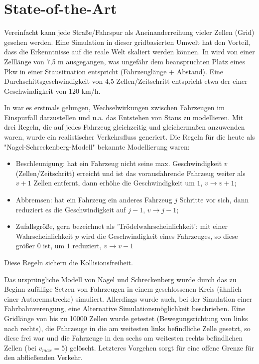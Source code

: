 \section{State-of-the-Art}
\label{sec:sota}

Vereinfacht kann jede Straße/Fahrspur als Aneinanderreihung vieler Zellen (Grid) gesehen werden. Eine Simulation in dieser gridbasierten Umwelt hat den Vorteil, dass die Erkenntnisse auf die reale Welt skaliert werden können. In \cite{na-sch} wird von einer Zelllänge von 7,5 m ausgegangen, was ungefähr dem beanspruchten Platz eines Pkw in einer Stausituation entspricht (Fahrzeuglänge + Abstand). Eine Durchschittsgeschwindigkeit von 4,5 Zellen/Zeitschritt entspricht etwa der einer Geschwindigkeit von 120 km/h.

In \cite{na-sch} war es erstmals gelungen, Wechselwirkungen zwischen Fahrzeugen im Einspurfall darzustellen und u.a. das Entstehen von Staus zu modellieren. Mit drei Regeln, die auf jedes Fahrzeug gleichzeitig und gleichermaßen anzuwenden waren, wurde ein realistischer Verkehrsfluss generiert. Die Regeln für die heute als "Nagel-Schreckenberg-Modell" bekannte Modellierung waren: 

\begin{itemize}
\item Beschleunigung: hat ein Fahrzeug nicht seine max. Geschwindigkeit $v$ (Zellen/Zeitschritt) erreicht und ist das vorausfahrende Fahrzeug weiter als $v+1$ Zellen entfernt, dann erhöhe die Geschwindigkeit um $1$, $v \rightarrow v+1$;
\item Abbremsen: hat ein Fahrzeug ein anderes Fahrzeug $j$ Schritte vor sich, dann reduziert es die Geschwindigkeit auf $j-1$, $v \rightarrow j-1$;
\item Zufallsgröße, gern bezeichnet als 'Trödelwahrscheinlichkeit': mit einer Wahrscheinlichkeit $p$ wird die Geschwindigkeit eines Fahrzeuges, so diese größer $0$ ist, um $1$ reduziert, $v \rightarrow v-1$
\end{itemize}

Diese Regeln sichern die Kollisionsfreiheit.

Das ursprüngliche Modell von Nagel und Schreckenberg wurde durch das zu Beginn zufällige Setzen von Fahrzeugen in einem geschlossenen Kreis (ähnlich einer Autorennstrecke) simuliert. Allerdings wurde auch, bei der Simulation einer Fahrbahnverengung, eine Alternative Simulationsmöglichkeit beschrieben. Eine Gridlänge von bis zu 10000 Zellen wurde getestet (Bewegungsrichtung von links nach rechts), die Fahrzeuge in die am weitesten links befindliche Zelle gesetzt, so diese frei war und die Fahrzeuge in den sechs am weitesten rechts befindlichen Zellen (bei $v_{max}=5$) gelöscht. Letzteres Vorgehen sorgt für eine offene Grenze für den abfließenden Verkehr.

